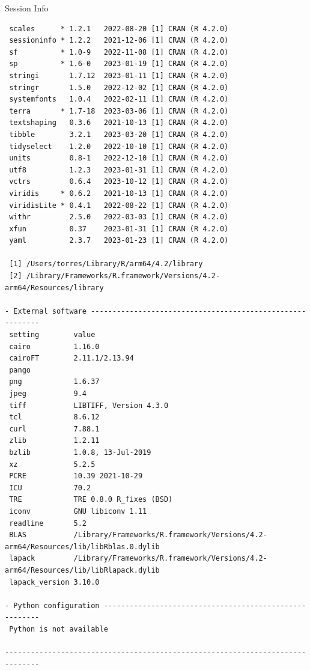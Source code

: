 \documentclass[
  ignorenonframetext,
  aspectratio=169,
]{beamer}
\newif\ifbibliography
\begin{document}
\begin{frame}[fragile]{Session Info}
\begin{verbatim}
 scales      * 1.2.1   2022-08-20 [1] CRAN (R 4.2.0)
 sessioninfo * 1.2.2   2021-12-06 [1] CRAN (R 4.2.0)
 sf          * 1.0-9   2022-11-08 [1] CRAN (R 4.2.0)
 sp          * 1.6-0   2023-01-19 [1] CRAN (R 4.2.0)
 stringi       1.7.12  2023-01-11 [1] CRAN (R 4.2.0)
 stringr       1.5.0   2022-12-02 [1] CRAN (R 4.2.0)
 systemfonts   1.0.4   2022-02-11 [1] CRAN (R 4.2.0)
 terra       * 1.7-18  2023-03-06 [1] CRAN (R 4.2.0)
 textshaping   0.3.6   2021-10-13 [1] CRAN (R 4.2.0)
 tibble        3.2.1   2023-03-20 [1] CRAN (R 4.2.0)
 tidyselect    1.2.0   2022-10-10 [1] CRAN (R 4.2.0)
 units         0.8-1   2022-12-10 [1] CRAN (R 4.2.0)
 utf8          1.2.3   2023-01-31 [1] CRAN (R 4.2.0)
 vctrs         0.6.4   2023-10-12 [1] CRAN (R 4.2.0)
 viridis     * 0.6.2   2021-10-13 [1] CRAN (R 4.2.0)
 viridisLite * 0.4.1   2022-08-22 [1] CRAN (R 4.2.0)
 withr         2.5.0   2022-03-03 [1] CRAN (R 4.2.0)
 xfun          0.37    2023-01-31 [1] CRAN (R 4.2.0)
 yaml          2.3.7   2023-01-23 [1] CRAN (R 4.2.0)

 [1] /Users/torres/Library/R/arm64/4.2/library
 [2] /Library/Frameworks/R.framework/Versions/4.2-arm64/Resources/library

- External software ----------------------------------------------------------
 setting        value
 cairo          1.16.0
 cairoFT        2.11.1/2.13.94
 pango
 png            1.6.37
 jpeg           9.4
 tiff           LIBTIFF, Version 4.3.0
 tcl            8.6.12
 curl           7.88.1
 zlib           1.2.11
 bzlib          1.0.8, 13-Jul-2019
 xz             5.2.5
 PCRE           10.39 2021-10-29
 ICU            70.2
 TRE            TRE 0.8.0 R_fixes (BSD)
 iconv          GNU libiconv 1.11
 readline       5.2
 BLAS           /Library/Frameworks/R.framework/Versions/4.2-arm64/Resources/lib/libRblas.0.dylib
 lapack         /Library/Frameworks/R.framework/Versions/4.2-arm64/Resources/lib/libRlapack.dylib
 lapack_version 3.10.0

- Python configuration -------------------------------------------------------
 Python is not available

------------------------------------------------------------------------------
\end{verbatim}

\linespread{2}
\end{frame}


\begin{frame}[allowframebreaks]{}
  \bibliographytrue
\end{frame}
\end{document}
